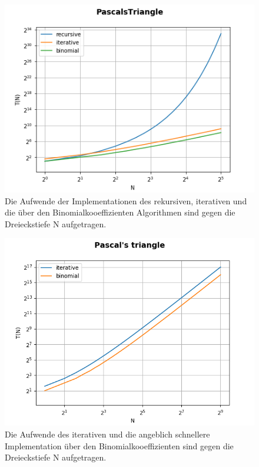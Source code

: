 \documentclass[
   draft=false
  ,paper=a4
  ,twoside=false
  ,fontsize=11pt
  ,headsepline
  ,DIV11
  ,parskip=full+
]{scrartcl} %
\begin{document}
\begin{figure}[htp]
	\label{fig:recuriterfast}
  	\centering
    \includegraphics[width=\textwidth]{./IMG/PascalsTriangle.png}
    \caption[recur iter fast]{Die Aufwende der Implementationen des rekursiven, iterativen und die über den Binomialkooeffizienten Algorithmen sind gegen die Dreieckstiefe N aufgetragen.}
\end{figure}
	
\begin{figure}[htp]
	\label{fig:iterfast}
  	\centering
    \includegraphics[width=\textwidth]{./IMG/iterfast.png}
    \caption[iter fast]{Die Aufwende des iterativen und die angeblich schnellere Implementation über den Binomialkooeffizienten sind gegen die Dreieckstiefe N aufgetragen.}
\end{figure}
\end{document}

